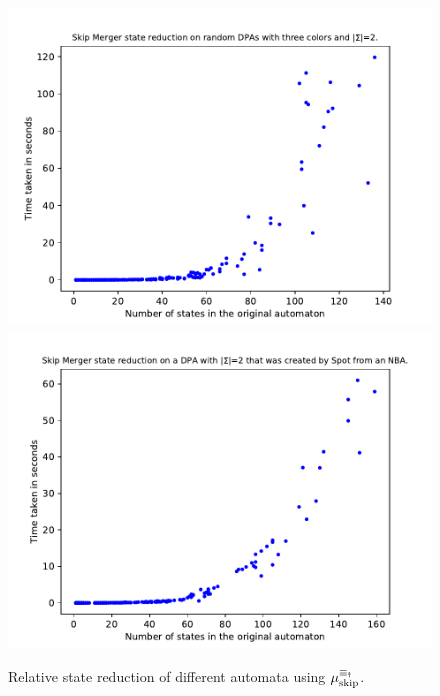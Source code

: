 \begin{figure}
\begin{minipage}{0.49\textwidth}
		\caption{Relative state reduction of different automata using $\mu_\text{skip}^{\equiv_\text{\Ankh}}$.}
		\label{fig:skip:empirical_size_hist}
	\end{minipage}
	\hfill
	\begin{minipage}{0.49\textwidth}
		\includegraphics[page=2,height=.3\textheight]{../data/analysis/skipper/gendet_ap1.pdf} 
		\includegraphics[page=2,height=.3\textheight]{../data/analysis/skipper/detspot_ap1.pdf} 

\end{minipage}
\end{figure}
